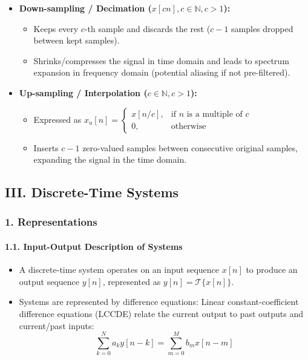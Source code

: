 \begin{itemize}
\tightlist
\item
  \textbf{Down-sampling / Decimation
  (\(x[cn], c \in \mathbb{N}, c > 1\)):}

  \begin{itemize}
  \tightlist
  \item
    Keeps every \(c\)-th sample and discards the rest (\(c-1\) samples
    dropped between kept samples).
  \item
    Shrinks/compresses the signal in time domain and leads to spectrum
    expansion in frequency domain (potential aliasing if not
    pre-filtered).
  \end{itemize}
\item
  \textbf{Up-sampling / Interpolation (\(c \in \mathbb{N}, c > 1\)):}

  \begin{itemize}
  \tightlist
  \item
    Expressed as
    \(x_u[n] = \begin{cases} x[n/c], & \text{if } n \text{ is a multiple of } c \\ 0, & \text{otherwise} \end{cases}\)
  \item
    Inserts \(c - 1\) zero-valued samples between consecutive original
    samples, expanding the signal in the time domain.
  \end{itemize}
\end{itemize}

\subsection{III. Discrete-Time
Systems}\label{iii.-discrete-time-systems}

\subsubsection{1. Representations}\label{representations-1}

\paragraph{1.1. Input-Output Description of
Systems}\label{input-output-description-of-systems}

\begin{itemize}
\tightlist
\item
  A discrete-time system operates on an input sequence \(x[n]\) to
  produce an output sequence \(y[n]\), represented as
  \(y[n] = \mathcal{T}\{x[n]\}\).
\item
  Systems are represented by difference equations: Linear
  constant-coefficient difference equations (LCCDE) relate the current
  output to past outputs and current/past inputs:
  \[\sum_{k=0}^{N} a_k y[n-k] = \sum_{m=0}^{M} b_m x[n-m]\]
\end{itemize}

